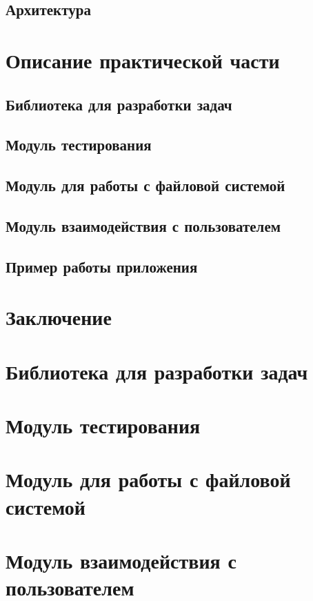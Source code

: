 \section{Архитектура}


\chapter{Описание практической части}
\section{Библиотека для разработки задач}

\section{Модуль тестирования}

\section{Модуль для работы с файловой системой}

\section{Модуль взаимодействия с пользователем}

\section{Пример работы приложения}


\chapter*{Заключение}




\newpage
\appendix
{}
\footnotesize
\chapter{Библиотека для разработки задач}

\chapter{Модуль тестирования}

\chapter{Модуль для работы с файловой системой}

\chapter{Модуль взаимодействия с пользователем}


